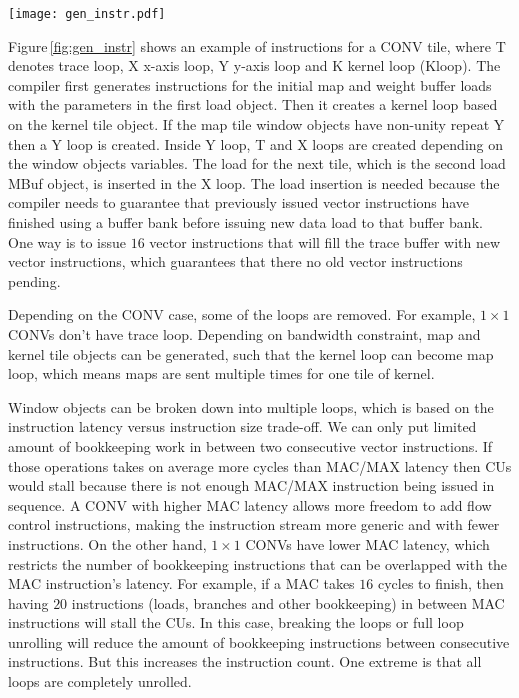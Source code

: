\documentclass{sig-alternate}
\begin{document}
\begin{figure*}[ht]
\centering
  \texttt{[image: gen\_instr.pdf]}
  \caption{Example of instruction generation for a CONV layer. Different layers create different number of objects, but they all become MAC/MAX for window objects and LD for load objects.}
  \label{fig:gen_instr}
\end{figure*}

Figure\,\ref{fig:gen_instr} shows an example of instructions for a CONV tile, where T denotes trace loop, X x-axis loop, Y y-axis loop and K kernel loop (Kloop). The compiler first generates instructions for the initial map and weight buffer loads with the parameters in the first load object. Then it creates a kernel loop based on the kernel tile object. If the map tile window objects have non-unity repeat Y then a Y loop is created. Inside Y loop, T and X loops are created depending on the window objects variables. The load for the next tile, which is the second load MBuf object, is inserted in the X loop. The load insertion is needed because the compiler needs to guarantee that previously issued vector instructions have finished using a buffer bank before issuing new data load to that buffer bank. One way is to issue $16$ vector instructions that will fill the trace buffer with new vector instructions, which guarantees that there no old vector instructions pending. 

Depending on the CONV case, some of the loops are removed. For example, $1\times1$ CONVs don't have trace loop. Depending on bandwidth constraint, map and kernel tile objects can be generated, such that the kernel loop can become map loop, which means maps are sent multiple times for one tile of kernel. 

Window objects can be broken down into multiple loops, which is based on the instruction latency versus instruction size trade-off. We can only put limited amount of bookkeeping work in between two consecutive vector instructions. If those operations takes on average more cycles than MAC/MAX latency then CUs would stall because there is not enough MAC/MAX instruction being issued in sequence. A CONV with higher MAC latency allows more freedom to add flow control instructions, making the instruction stream more generic and with fewer instructions. On the other hand, $1\times1$ CONVs have lower MAC latency, which restricts the number of bookkeeping instructions that can be overlapped with the MAC instruction's latency. For example, if a MAC takes $16$ cycles to finish, then having $20$ instructions (loads, branches and other bookkeeping) in between MAC instructions will stall the CUs. In this case, breaking the loops or full loop unrolling will reduce the amount of bookkeeping instructions between consecutive instructions. But this increases the instruction count.  One extreme is that all loops are completely unrolled. 
\end{document}
